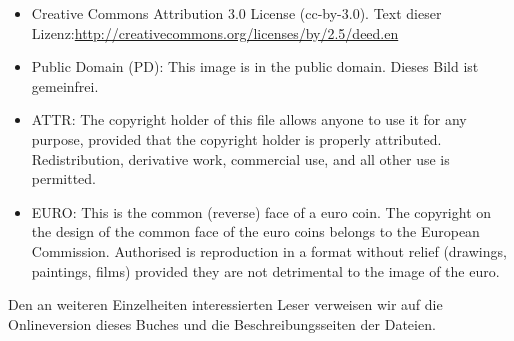 \begin{small}
\begin{itemize}
\item Creative Commons Attribution 3.0 License (cc-by-3.0). Text dieser Lizenz:\newline{}\url{http://creativecommons.org/licenses/by/2.5/deed.en}

\item Public Domain (PD): This image is in the public domain. Dieses Bild ist gemeinfrei.

\item ATTR:  The copyright holder of this file allows anyone to use it for any purpose, provided that the copyright holder is properly attributed. Redistribution, derivative work, commercial use, and all other use is permitted. 

\item EURO: This is the common (reverse) face of a euro coin. The copyright on the design of the common face of the euro coins belongs to the European Commission. Authorised is reproduction in a format without relief (drawings, paintings, films) provided they are not detrimental to the image of the euro.
\end{itemize}

Den an weiteren Einzelheiten interessierten Leser verweisen wir auf die Onlineversion dieses Buches und die Beschreibungsseiten der Dateien.

\end{small}

\pagebreak
